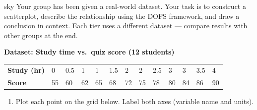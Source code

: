 \documentclass[10pt]{article}
\begin{document}
\namepartnerperiod

\vspace{0.18in}

\begin{scenariobox}[Context]{sky}
\small
Your group has been given a real-world dataset. Your task is to construct a scatterplot,
describe the relationship using the DOFS framework, and draw a conclusion in context.
Each tier uses a different dataset --- compare results with other groups at the end.
\end{scenariobox}

\vspace{0.12in}

\begin{tcolorbox}[colback=white, colframe=black!40, boxrule=0.8pt, arc=2mm,
    left=4mm, right=4mm, top=3mm, bottom=3mm,
    title={\textbf{Tier R --- Remediate}}, fonttitle=\bfseries, halign title=center]
\small

\textbf{Dataset: Study time vs.\ quiz score (12 students)}

\vspace{6pt}
\renewcommand{\arraystretch}{1.4}
\begin{tabularx}{\linewidth}{@{} l *{12}{C{0.72cm}} @{}}
\textbf{Study (hr)} & 0 & 0.5 & 1 & 1 & 1.5 & 2 & 2 & 2.5 & 3 & 3 & 3.5 & 4 \\
\textbf{Score}      & 55 & 60 & 62 & 65 & 68 & 72 & 75 & 78 & 80 & 84 & 86 & 90 \\
\end{tabularx}

\vspace{10pt}

\begin{enumerate}[leftmargin=1.6em, itemsep=0.18in]

  \item Plot each point on the grid below. Label both axes (variable name and units).

        \begin{center}
        \end{center}


\end{enumerate}
\end{tcolorbox}
\end{document}
